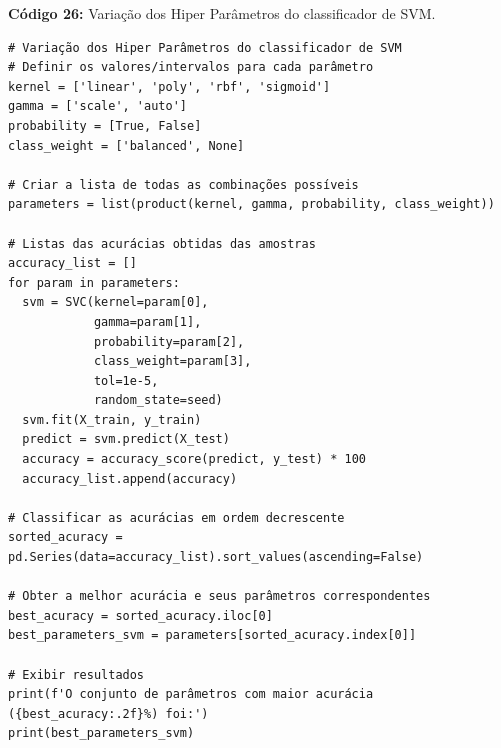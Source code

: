 \documentclass[a4paper,12pt]{article} %
\begin{document}
\begin{center}
\textbf{Código 26:} Variação dos Hiper Parâmetros do classificador de SVM.
\begin{verbatim}
# Variação dos Hiper Parâmetros do classificador de SVM
# Definir os valores/intervalos para cada parâmetro
kernel = ['linear', 'poly', 'rbf', 'sigmoid']
gamma = ['scale', 'auto']
probability = [True, False]
class_weight = ['balanced', None]

# Criar a lista de todas as combinações possíveis
parameters = list(product(kernel, gamma, probability, class_weight))

# Listas das acurácias obtidas das amostras
accuracy_list = []
for param in parameters:
  svm = SVC(kernel=param[0],
            gamma=param[1],
            probability=param[2],
            class_weight=param[3],
            tol=1e-5,
            random_state=seed)
  svm.fit(X_train, y_train)
  predict = svm.predict(X_test)
  accuracy = accuracy_score(predict, y_test) * 100
  accuracy_list.append(accuracy)

# Classificar as acurácias em ordem decrescente
sorted_acuracy = pd.Series(data=accuracy_list).sort_values(ascending=False)

# Obter a melhor acurácia e seus parâmetros correspondentes
best_acuracy = sorted_acuracy.iloc[0]
best_parameters_svm = parameters[sorted_acuracy.index[0]]

# Exibir resultados
print(f'O conjunto de parâmetros com maior acurácia ({best_acuracy:.2f}%) foi:')
print(best_parameters_svm)
\end{verbatim}
\end{center}
\end{document}
